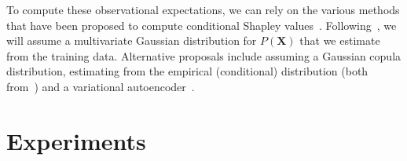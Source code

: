 \documentclass{article}
\newcommand{\vX}{\mathbf{X}}
\newcommand{\vx}{\mathbf{x}}
\newcommand{\dodo}{\mathit{do}}
\newcommand{\lvdo}[1]{\dodo(\vX_{#1} = \vx_{#1})}
\newcommand{\spa}{\mathop{\textit{\scriptsize pa}}}
\newcommand{\onder}[2]{{#1}_{\mbox{\scriptsize #2}}}
\newcommand{\isequal}{\hspace*{-2.5mm} & = & \hspace*{-2.5mm}}
\newcommand{\chaincomponents}{{\cal T}}
\newcommand{\comment}[1]{{\color{red} #1}}
\begin{document}
%
%
%
%
%
%


To compute these observational expectations, we can rely on the various methods that have been proposed to compute conditional Shapley values~\cite{aas2019explaining,frye2019asymmetric}. Following~\cite{aas2019explaining}, we will assume a multivariate Gaussian distribution for $P(\vX)$ that we estimate from the training data. Alternative proposals include assuming a Gaussian copula distribution, estimating from the empirical (conditional) distribution (both from~\cite{aas2019explaining}) and a variational autoencoder~\cite{frye2019asymmetric}.

\section{Experiments}
\end{document}
